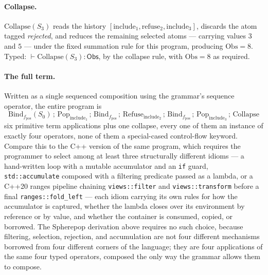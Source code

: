 \documentclass[11pt]{article}
\begin{document}
\paragraph{Collapse.} $\mathrm{Collapse}(S_3)$ reads the history $[\mathrm{include}_1, \mathrm{refuse}_2, \mathrm{include}_3]$, discards the atom tagged \emph{rejected}, and reduces the remaining selected atoms --- carrying values $3$ and $5$ --- under the fixed summation rule for this program, producing $\mathrm{Obs} = 8$. Typed: $\vdash \mathrm{Collapse}(S_3) : \mathsf{Obs}$, by the collapse rule, with $\mathrm{Obs} = 8$ as required.

\paragraph{The full term.} Written as a single sequenced composition using the grammar's sequence operator, the entire program is
\[
\mathrm{Bind}_{f_{\mathrm{pos}}}(S_0) \,;\, \mathrm{Pop}_{\mathrm{include}_1} \,;\, \mathrm{Bind}_{f_{\mathrm{pos}}} \,;\, \mathrm{Refuse}_{\mathrm{include}_2} \,;\, \mathrm{Bind}_{f_{\mathrm{pos}}} \,;\, \mathrm{Pop}_{\mathrm{include}_3} \,;\, \mathrm{Collapse}
\]
six primitive term applications plus one collapse, every one of them an instance of exactly four operators, none of them a special-cased control-flow keyword. Compare this to the C++ version of the same program, which requires the programmer to select among at least three structurally different idioms --- a hand-written loop with a mutable accumulator and an \texttt{if} guard, \texttt{std::accumulate} composed with a filtering predicate passed as a lambda, or a C++20 ranges pipeline chaining \texttt{views::filter} and \texttt{views::transform} before a final \texttt{ranges::fold\_left} --- each idiom carrying its own rules for how the accumulator is captured, whether the lambda closes over its environment by reference or by value, and whether the container is consumed, copied, or borrowed. The Spherepop derivation above requires no such choice, because filtering, selection, rejection, and accumulation are not four different mechanisms borrowed from four different corners of the language; they are four applications of the same four typed operators, composed the only way the grammar allows them to compose.
\end{document}
